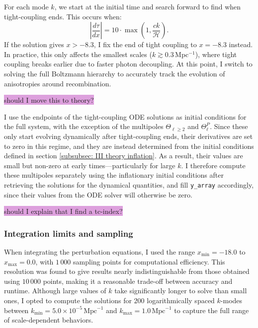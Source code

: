 \documentclass{aa}
\numberwithin{equation}{section}
\numberwithin{table}{section}
\numberwithin{figure}{section}
\begin{document}
For each mode $k$, we start at the initial time and search forward to find when tight-coupling ends. This occurs when:
\begin{equation}
\left| \frac{d\tau}{dx} \right| = 10 \cdot \max\left(1, \frac{ck}{\mathcal{H}} \right).
\end{equation}
If the solution gives $x > -8.3$, I fix the end of tight coupling to $x = -8.3$ instead. In practice, this only affects the smallest scales ($k \gtrsim 0.3\,$Mpc$^{-1}$), where tight coupling breaks earlier due to faster photon decoupling. At this point, I switch to solving the full Boltzmann hierarchy to accurately track the evolution of anisotropies around recombination. 

\colorbox{Plum}{should I move this to theory?}

I use the endpoints of the tight-coupling ODE solutions as initial conditions for the full system, with the exception of the multipoles $\Theta_{\ell \geq 2}$ and $\Theta^P_\ell$. Since these only start evolving dynamically after tight-coupling ends, their derivatives are set to zero in this regime, and they are instead determined from the initial conditions defined in section \ref{subsubsec: III theory inflation}. As a result, their values are small but non-zero at early times—particularly for large $k$. I therefore compute these multipoles separately using the inflationary initial conditions after retrieving the solutions for the dynamical quantities, and fill \verb|y_array| accordingly, since their values from the ODE solver will otherwise be zero.


\colorbox{Plum}{should I explain that I find a tc-index?}


\subsubsection{Integration limits and sampling}\label{subsubsec: III methods limits}
When integrating the perturbation equations, I used the range $x_\text{min} = -18.0$ to $x_\text{max} = 0.0$, with $1\,000$ sampling points for computational efficiency. This resolution was found to give results nearly indistinguishable from those obtained using $10\,000$ points, making it a reasonable trade-off between accuracy and runtime. Although large values of $k$ take significantly longer to solve than small ones, I opted to compute the solutions for $200$ logarithmically spaced $k$-modes between $k_\text{min} = 5.0 \times 10^{-5}\,\text{Mpc}^{-1}$ and $k_\text{max} = 1.0\,\text{Mpc}^{-1}$ to capture the full range of scale-dependent behaviors.
\end{document}
